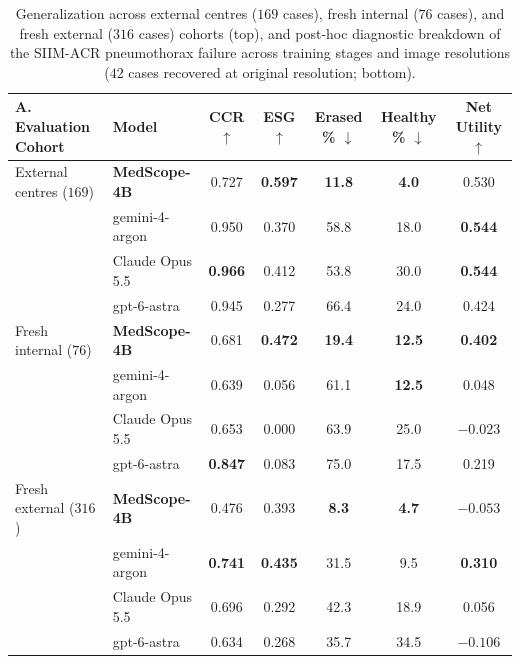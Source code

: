 \documentclass{article} %
\begin{document}
\begin{table}[h]
\caption{Generalization across external centres ($169$ cases), fresh internal ($76$ cases), and fresh external ($316$ cases) cohorts (top), and post-hoc diagnostic breakdown of the SIIM-ACR pneumothorax failure across training stages and image resolutions ($42$ cases recovered at original resolution; bottom).}
\label{tab:generalization_and_pneumo}
\begin{center}
\small
\begin{tabular}{llccccc}
\toprule
\textbf{A. Evaluation Cohort} & \textbf{Model} & \textbf{CCR} $\uparrow$ & \textbf{ESG} $\uparrow$ & \textbf{Erased \%} $\downarrow$ & \textbf{Healthy \%} $\downarrow$ & \textbf{Net Utility} $\uparrow$ \\
\midrule
External centres ($169$) & \textbf{MedScope-4B} & 0.727 & \textbf{0.597} & \textbf{11.8} & \textbf{4.0} & 0.530 \\
 & gemini-4-argon & 0.950 & 0.370 & 58.8 & 18.0 & \textbf{0.544} \\
 & Claude Opus 5.5 & \textbf{0.966} & 0.412 & 53.8 & 30.0 & \textbf{0.544} \\
 & gpt-6-astra & 0.945 & 0.277 & 66.4 & 24.0 & 0.424 \\
\midrule
Fresh internal ($76$) & \textbf{MedScope-4B} & 0.681 & \textbf{0.472} & \textbf{19.4} & \textbf{12.5} & \textbf{0.402} \\
 & gemini-4-argon & 0.639 & 0.056 & 61.1 & \textbf{12.5} & 0.048 \\
 & Claude Opus 5.5 & 0.653 & 0.000 & 63.9 & 25.0 & $-0.023$ \\
 & gpt-6-astra & \textbf{0.847} & 0.083 & 75.0 & 17.5 & 0.219 \\
\midrule
Fresh external ($316$) & \textbf{MedScope-4B} & 0.476 & 0.393 & \textbf{8.3} & \textbf{4.7} & $-0.053$ \\
 & gemini-4-argon & \textbf{0.741} & \textbf{0.435} & 31.5 & 9.5 & \textbf{0.310} \\
 & Claude Opus 5.5 & 0.696 & 0.292 & 42.3 & 18.9 & 0.056 \\
 & gpt-6-astra & 0.634 & 0.268 & 35.7 & 34.5 & $-0.106$ \\
\bottomrule
\end{tabular}


\end{center}
\end{table}
\end{document}
